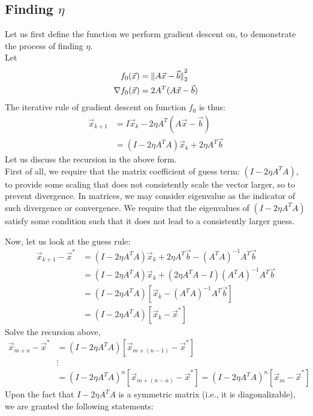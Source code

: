 \subsection{Finding $\eta$}
Let us first define the function we perform gradient descent on, to demonstrate the process of finding $\eta$. \\
Let
\begin{align*}
    f_0 (\vec{x}) &= \pnorm[2]{A \vec{x} - \vec{b}}{2} \\
    \nabla f_0 (\vec{x}) &= 2 A^T (A \vec{x} - \vec{b})
\end{align*}
The iterative rule of gradient descent on function $f_0$ is thus:
\begin{align*}
    \vec{x}_{k + 1}
    &= I \vec{x}_k - 2 \eta A^T (A \vec{x} - \vec{b}) \\
    &= (I - 2 \eta A^T A) \vec{x}_k + 2 \eta A^T \vec{b}
\end{align*}
Let us discuss the recursion in the above form. \\
First of all, we require that the matrix coefficient of guess term: $(I - 2 \eta A^T A)$, to provide some scaling that does not consistently scale the vector larger, so to prevent divergence.
In matrices, we may consider eigenvalue as the indicator of such divergence or convergence. We require that the eigenvalues of $(I - 2 \eta A^T A)$ satisfy some condition such that it does not lead to a consistently larger guess.
\par
Now, let us look at the guess rule:
\begin{align*}
    \vec{x}_{k + 1} - \vec{x}^*
    &= (I - 2 \eta A^T A) \vec{x}_k + 2 \eta A^T \vec{b} - {(A^T A)}^{-1} A^T \vec{b} \\
    &= (I - 2 \eta A^T A) \vec{x}_k + (2 \eta A^T A - I) {(A^T A)}^{-1} A^T \vec{b} \\
    &= (I - 2 \eta A^T A) [\vec{x}_k - {(A^T A)}^{-1} A^T \vec{b}] \\
    &= (I - 2 \eta A^T A) [\vec{x}_k - \vec{x}^*]
\end{align*}
Solve the recursion above,
\begin{align*}
    \vec{x}_{m + n} - \vec{x}^*
    &= (I - 2 \eta A^T A) [\vec{x}_{m + (n - 1)} - \vec{x}^*] \\
    &\vdots \\
    &= {(I - 2 \eta A^T A)}^n [\vec{x}_{m + (n - n)} - \vec{x}^*]
    = {(I - 2 \eta A^T A)}^n [\vec{x}_m - \vec{x}^*]
\end{align*}
Upon the fact that $I - 2 \eta A^T A$ is a symmetric matrix (i.e., it is diagonalizable), we are granted the following statements:
